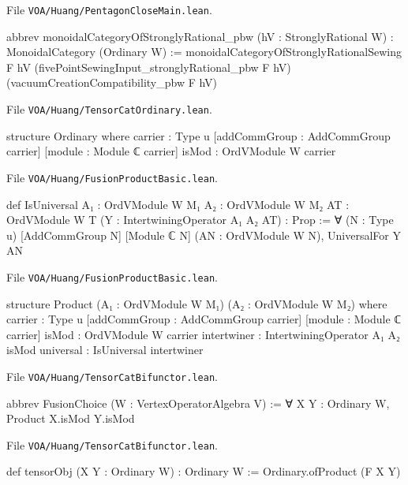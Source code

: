 \documentclass[11pt,openany]{book}
\newcommand{\leanpath}[1]{\texttt{\small #1}}
\theoremstyle{definition}
\theoremstyle{plain}
\begin{document}
{\raggedright\noindent File \leanpath{VOA/\allowbreak Huang/\allowbreak PentagonCloseMain.lean}.\par}
\begin{leancode}
abbrev monoidalCategoryOfStronglyRational_pbw (hV : StronglyRational W) :
    MonoidalCategory (Ordinary W) :=
  monoidalCategoryOfStronglyRationalSewing F hV (fivePointSewingInput_stronglyRational_pbw F hV)
    (vacuumCreationCompatibility_pbw F hV)

\end{leancode}
{\raggedright\noindent File \leanpath{VOA/\allowbreak Huang/\allowbreak TensorCatOrdinary.lean}.\par}
\begin{leancode}
structure Ordinary where
  carrier : Type u
  [addCommGroup : AddCommGroup carrier]
  [module : Module ℂ carrier]
  isMod : OrdVModule W carrier
\end{leancode}
{\raggedright\noindent File \leanpath{VOA/\allowbreak Huang/\allowbreak FusionProductBasic.lean}.\par}
\begin{leancode}
def IsUniversal {A₁ : OrdVModule W M₁} {A₂ : OrdVModule W M₂}
    {AT : OrdVModule W T} (Y : IntertwiningOperator A₁ A₂ AT) : Prop :=
  ∀ (N : Type u) [AddCommGroup N] [Module ℂ N] (AN : OrdVModule W N), UniversalFor Y AN
\end{leancode}
{\raggedright\noindent File \leanpath{VOA/\allowbreak Huang/\allowbreak FusionProductBasic.lean}.\par}
\begin{leancode}
structure Product (A₁ : OrdVModule W M₁) (A₂ : OrdVModule W M₂) where
  carrier : Type u
  [addCommGroup : AddCommGroup carrier]
  [module : Module ℂ carrier]
  isMod : OrdVModule W carrier
  intertwiner : IntertwiningOperator A₁ A₂ isMod
  universal : IsUniversal intertwiner
\end{leancode}
{\raggedright\noindent File \leanpath{VOA/\allowbreak Huang/\allowbreak TensorCatBifunctor.lean}.\par}
\begin{leancode}
abbrev FusionChoice (W : VertexOperatorAlgebra V) :=
  ∀ X Y : Ordinary W, Product X.isMod Y.isMod
\end{leancode}
{\raggedright\noindent File \leanpath{VOA/\allowbreak Huang/\allowbreak TensorCatBifunctor.lean}.\par}
\begin{leancode}
def tensorObj (X Y : Ordinary W) : Ordinary W := Ordinary.ofProduct (F X Y)
\end{leancode}
\end{document}
